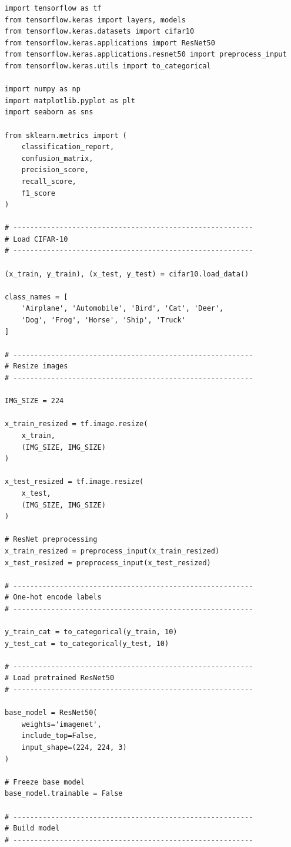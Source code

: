 \documentclass[12pt,a4paper]{article}
\begin{document}
\begin{lstlisting}
import tensorflow as tf
from tensorflow.keras import layers, models
from tensorflow.keras.datasets import cifar10
from tensorflow.keras.applications import ResNet50
from tensorflow.keras.applications.resnet50 import preprocess_input
from tensorflow.keras.utils import to_categorical

import numpy as np
import matplotlib.pyplot as plt
import seaborn as sns

from sklearn.metrics import (
    classification_report,
    confusion_matrix,
    precision_score,
    recall_score,
    f1_score
)

# ---------------------------------------------------------
# Load CIFAR-10
# ---------------------------------------------------------

(x_train, y_train), (x_test, y_test) = cifar10.load_data()

class_names = [
    'Airplane', 'Automobile', 'Bird', 'Cat', 'Deer',
    'Dog', 'Frog', 'Horse', 'Ship', 'Truck'
]

# ---------------------------------------------------------
# Resize images
# ---------------------------------------------------------

IMG_SIZE = 224

x_train_resized = tf.image.resize(
    x_train,
    (IMG_SIZE, IMG_SIZE)
)

x_test_resized = tf.image.resize(
    x_test,
    (IMG_SIZE, IMG_SIZE)
)

# ResNet preprocessing
x_train_resized = preprocess_input(x_train_resized)
x_test_resized = preprocess_input(x_test_resized)

# ---------------------------------------------------------
# One-hot encode labels
# ---------------------------------------------------------

y_train_cat = to_categorical(y_train, 10)
y_test_cat = to_categorical(y_test, 10)

# ---------------------------------------------------------
# Load pretrained ResNet50
# ---------------------------------------------------------

base_model = ResNet50(
    weights='imagenet',
    include_top=False,
    input_shape=(224, 224, 3)
)

# Freeze base model
base_model.trainable = False

# ---------------------------------------------------------
# Build model
# ---------------------------------------------------------


\end{lstlisting}
\end{document}
